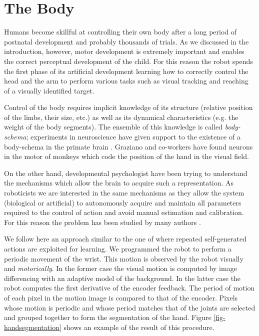\section{The Body}
\label{sect:body}

Humans become skillful at controlling their own body after a long period of postnatal development and probably thousands of trials. As we discussed in the introduction, however, motor development is extremely important and enables the correct perceptual development of the child. For this reason the robot spends the first phase of its artificial development learning how to correctly control the head and the arm to perform various tasks such as visual tracking and reaching of a visually identified target.

Control of the body requires implicit knowledge of its structure (relative position of the limbs, their size, etc.) as well as its dynamical characteristics (e.g. the weight of the body segments). The ensemble of this knowledge is called \emph{body-schema}; experiments in neuroscience have given support to the existence of a body-schema in the primate brain \cite{graziano99whereis,graziano00coding}. Graziano and co-workers have found neurons in the motor of monkeys which code the position of the hand in the visual field.

On the other hand, developmental psychologist have been trying to understand the mechanisms which allow the brain to acquire such a representation. As roboticists we are interested in the same mechanisms as they allow the system (biological or artificial) to autonomously acquire and maintain all parameters required to the control of action and avoid manual estimation and calibration. For this reason the problem has been studied by many authors \cite{yoshikawa03doestheinvariance,fitzpatrick04feelthebeat,metta03early}.

We follow here an approach similar to the one of \cite{fitzpatrick04feelthebeat,metta03early} where repeated self-generated actions are exploited for learning. We programmed the robot to perform a periodic movement of the wrist. This motion is observed by the robot visually and \emph{motorically}. In the former case the visual motion is computed by image differencing with an adaptive model of the background. In the latter case the robot computes the first derivative of the encoder feedback. The period of motion of each pixel in the motion image is compared to that of the encoder. Pixels whose motion is periodic and whose period matches that of the joints are selected and grouped together to form the segmentation of the hand. Figure \ref{fig-handsegmentation} shows an example of the result of this procedure.


